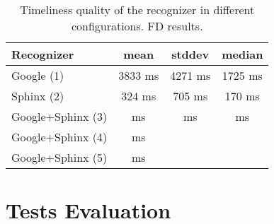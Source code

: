\begin {table}
\label{tab:alignment_incr} 
\begin{center}
\caption {Timeliness quality of the recognizer in different configurations. FD
results.}
    \begin{tabular}{ l  c  c  c }
    \toprule
    Recognizer & mean & stddev & median \\ \toprule
    Google (1)  & 3833 ms & 4271 ms & 1725 ms  \\ 
    Sphinx (2)  & 324 ms & 705 ms & 170 ms \\ 
    Google+Sphinx (3)  & ms & ms & ms \\ 
    Google+Sphinx (4)  & ms  & & \\ 
    Google+Sphinx (5)  & ms  & &\\ \bottomrule   
    \end{tabular}
\end{center}
\end {table}

\section {Tests Evaluation} 